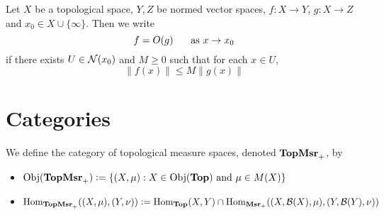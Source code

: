 \documentclass{book}
\begin{document}
\begin{defn} \ld{}
	Let $X$ be a topological space, $Y, Z$ be normed vector spaces, $f:X \rightarrow Y$, $g: X \rightarrow Z$ and $x_0 \in X \cup \{\infty\}$. Then we write $$f = O(g) \hspace{.5cm} \text{ as } x \rightarrow x_0$$ if there exists $U \in \mathcal{N}(x_0)$ and $M \geq 0$ such that for each $x \in U$, $$\|f(x)\| \leq M\|g(x)\|$$
\end{defn}



























\newpage
\chapter{Categories}


\begin{defn}
	We define the category of topological measure spaces, denoted $\operatorname*{\text{\textbf{TopMsr}}_{+}}$, by 
	\begin{itemize}
		\item $\operatorname{Obj}(\operatorname*{\text{\textbf{TopMsr}}_{+}}) \vcentcolon= \{(X, \mu): X \in \operatorname{Obj}(\operatorname*{\text{\textbf{Top}}}) \text{ and } \mu \in M(X)\}$			
		\item $\operatorname{Hom}_{\operatorname*{\text{\textbf{TopMsr}}_{+}}}((X, \mu), (Y, \nu)) \vcentcolon= \operatorname{Hom}_{\operatorname*{\text{\textbf{Top}}}}(X, Y) \cap \operatorname{Hom}_{\operatorname*{\text{\textbf{Msr}}_{+}}}((X, \mathcal{B}(X), \mu), (Y, \mathcal{B}(Y), \nu))$
	\end{itemize}
\end{defn}
\end{document}
